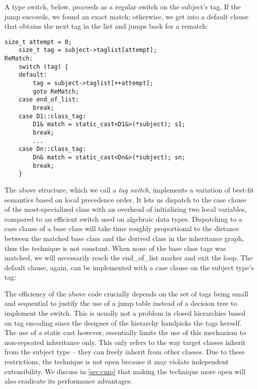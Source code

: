 A type switch, below, %
proceeds as 
a regular switch on the subject's tag. If the jump succeeds, we found an exact 
match; otherwise, we get into a default clause that obtains the next tag in the
list and jumps back %
for a rematch:

\begin{lstlisting}[keepspaces]
    size_t attempt = 0; 
    size_t tag = subject->taglist[attempt];
ReMatch:
    switch (tag) {
    default:
        tag = subject->taglist[++attempt];
        goto ReMatch;
    case end_of_list: 
        break;
    case D1::class_tag: 
        D1& match = static_cast<D1&>(*subject); s1;
        break;
        ...
    case Dn::class_tag: 
        Dn& match = static_cast<Dn&>(*subject); sn;
        break;
    }
\end{lstlisting}

\noindent
The above structure, which we call a \emph{tag switch}, implements a variation of 
best-fit semantics based on local precedence order. It lets us dispatch to the case 
clause of the most-specialized class with an overhead of initializing two 
local variables, compared to an efficient switch used on algebraic data types. 
Dispatching to a case clause of a base class will take time roughly proportional 
to the distance between the matched base class and the derived class in the 
inheritance graph, thus the technique is not constant. When none of the base 
class tags was matched, we will necessarily reach the end\_of\_list marker %
and exit the loop. %
The default clause, %
again, can be implemented with a case clause on the subject type's tag: 

The efficiency of the above code crucially depends on the set of tags 
being small and sequential to justify the use of a jump table instead of a
decision tree to implement the switch. This is usually not a problem in closed 
hierarchies based on tag encoding since the designer of the hierarchy handpicks 
the tags herself. The use of a static cast %
however, essentially limits the use of 
this mechanism to non-repeated inheritance only. This only refers to the way target 
classes inherit from the subject type -- they can freely inherit from other classes. 
Due to these restrictions, the technique is not open because it may  
violate independent extensibility. We discuss in \textsection\ref{sec:cmp} that 
making the technique more open will also eradicate its performance advantages.
